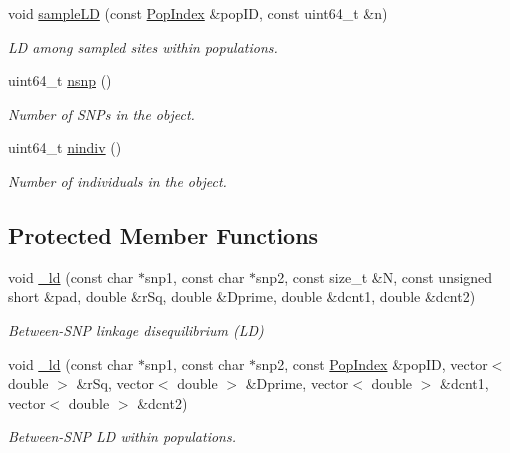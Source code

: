 \begin{DoxyCompactItemize}
void \hyperlink{classvarfiles_1_1_bed_file_i_aca4f3b7ba7fa45b6a0ed1341606858f1}{sample\+LD} (const \hyperlink{classvarfiles_1_1_pop_index}{Pop\+Index} \&pop\+ID, const uint64\+\_\+t \&n)
\begin{DoxyCompactList}\small\item\em LD among sampled sites within populations. \end{DoxyCompactList}\item 
\mbox{\label{classvarfiles_1_1_bed_file_i_ae55d0621562683d8f5aa23716c706bf7}} 
uint64\+\_\+t \hyperlink{classvarfiles_1_1_bed_file_i_ae55d0621562683d8f5aa23716c706bf7}{nsnp} ()
\begin{DoxyCompactList}\small\item\em Number of S\+N\+Ps in the object. \end{DoxyCompactList}\item 
\mbox{\label{classvarfiles_1_1_bed_file_i_a083c4457b8fc9d762e45878e83826b4d}} 
uint64\+\_\+t \hyperlink{classvarfiles_1_1_bed_file_i_a083c4457b8fc9d762e45878e83826b4d}{nindiv} ()
\begin{DoxyCompactList}\small\item\em Number of individuals in the object. \end{DoxyCompactList}\end{DoxyCompactItemize}
\subsection*{Protected Member Functions}
\begin{DoxyCompactItemize}
\item 
void \hyperlink{classvarfiles_1_1_bed_file_i_a9b6f8cbb9ae05056a7cd3d487fb26c30}{\+\_\+ld} (const char $\ast$snp1, const char $\ast$snp2, const size\+\_\+t \&N, const unsigned short \&pad, double \&r\+Sq, double \&Dprime, double \&dcnt1, double \&dcnt2)
\begin{DoxyCompactList}\small\item\em Between-\/\+S\+NP linkage disequilibrium (LD) \end{DoxyCompactList}\item 
void \hyperlink{classvarfiles_1_1_bed_file_i_ac0ebb71cdebd43d1b024cfc747fd53d1}{\+\_\+ld} (const char $\ast$snp1, const char $\ast$snp2, const \hyperlink{classvarfiles_1_1_pop_index}{Pop\+Index} \&pop\+ID, vector$<$ double $>$ \&r\+Sq, vector$<$ double $>$ \&Dprime, vector$<$ double $>$ \&dcnt1, vector$<$ double $>$ \&dcnt2)
\begin{DoxyCompactList}\small\item\em Between-\/\+S\+NP LD within populations. \end{DoxyCompactList}\end{DoxyCompactItemize}
